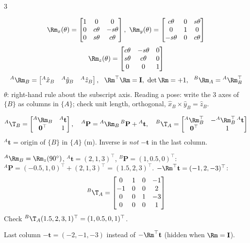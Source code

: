\begin{multicols}{3}
\begin{fbx}
\[\Rm_x(\theta)=\begin{bmatrix}1&0&0\\0&c\theta&-s\theta\\0&s\theta&c\theta\end{bmatrix},\
\Rm_y(\theta)=\begin{bmatrix}c\theta&0&s\theta\\0&1&0\\-s\theta&0&c\theta\end{bmatrix}\]
\[\Rm_z(\theta)=\begin{bmatrix}c\theta&-s\theta&0\\s\theta&c\theta&0\\0&0&1\end{bmatrix}\]
\[{}^A\Rm_B=\begin{bmatrix}{}^A\hat x_B&{}^A\hat y_B&{}^A\hat z_B\end{bmatrix},\ \ \Rm^\top\Rm=\mathbf I,\ \det\Rm=+1,\ \ {}^B\Rm_A={}^A\Rm_B^{\top}\]
$\theta$: right-hand rule about the subscript axis. Reading a pose: write the 3 axes of $\{B\}$ as columns in $\{A\}$; check unit length, orthogonal, $\hat x_B\times\hat y_B=\hat z_B$.
\end{fbx}
\begin{fbx}
\[{}^A\T_B=\begin{bmatrix}{}^A\Rm_B&{}^A\mathbf t\\\mathbf 0^\top&1\end{bmatrix},\quad {}^A\mathbf P={}^A\Rm_B\,{}^B\mathbf P+{}^A\mathbf t,\quad
{}^B\T_A=\begin{bmatrix}{}^A\Rm_B^\top&-{}^A\Rm_B^\top\,{}^A\mathbf t\\\mathbf 0^\top&1\end{bmatrix}\]
${}^A\mathbf t$ = origin of $\{B\}$ in $\{A\}$ (m). Inverse is \emph{not} $-\mathbf t$ in the last column.
\end{fbx}
\begin{worked}
${}^A\Rm_B=\Rm_z(90^\circ)$, ${}^A\mathbf t=(2,1,3)^\top$, ${}^B\mathbf P=(1,0.5,0)^\top$: ${}^A\mathbf P=(-0.5,1,0)^\top+(2,1,3)^\top=(1.5,2,3)^\top$. $-\Rm^\top\mathbf t=(-1,2,-3)^\top$:
\[{}^B\T_A=\begin{bmatrix}0&1&0&-1\\-1&0&0&2\\0&0&1&-3\\0&0&0&1\end{bmatrix}\]
Check ${}^B\T_A(1.5,2,3,1)^\top=(1,0.5,0,1)^\top$. \chk
\end{worked}
\begin{trap}
Last column $-\mathbf t=(-2,-1,-3)$ instead of $-\Rm^\top\mathbf t$ (hidden when $\Rm=\mathbf I$).
\end{trap}


\end{multicols}
